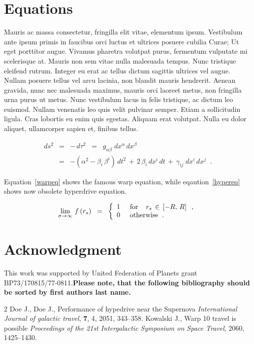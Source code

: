 \documentclass[a4paper,10pt]{article}
\begin{document}
\section{Equations}
Mauris ac massa consectetur, fringilla elit vitae, elementum ipsum. Vestibulum ante ipsum primis in faucibus orci luctus et ultrices posuere cubilia Curae; Ut eget porttitor augue. Vivamus pharetra volutpat purus, fermentum vulputate mi scelerisque at. Mauris non sem vitae nulla malesuada tempus. Nunc tristique eleifend rutrum. Integer eu erat ac tellus dictum sagittis ultrices vel augue. Nullam posuere tellus vel arcu lacinia, non blandit mauris hendrerit. Aenean gravida, nunc nec malesuada maximus, mauris orci laoreet metus, non fringilla urna purus ut metus. Nunc vestibulum lacus in felis tristique, ac dictum leo euismod. Nullam venenatis leo quis velit pulvinar semper. Etiam a sollicitudin ligula. Cras lobortis eu enim quis egestas. Aliquam erat volutpat. Nulla eu dolor aliquet, ullamcorper sapien et, finibus tellus.

\begin{eqnarray} d s^2
&=& - \, d \tau^2 \;\;=\;\; g_{\alpha \beta} \; d x^{\alpha} \, d
x^{\beta} \nonumber \\ &=& - \left( \alpha^2 - \beta_i \, \beta^i
\right) \, d t^2 \,+\, 2 \, \beta_i \, d x^i \, d t \,+\, \gamma_{ij}
\; d x^i \, d x^j \;\; .  \label{warpeq}  \end{eqnarray}

Equation~\ref{warpeq} shows the famous warp equation, while eqaution~\ref{hypereq} shows now obsolete hyperdrive equation.

 \begin{equation}
\lim_{\sigma \rightarrow \infty} \, f \left( r_s \right) \;\;=\;\; \left\{ \begin{array}{l} 1 \hspace{5mm}  {\rm for}
\hspace{4mm} r_s \,\in\, \left[ -R,\,R \right] \;\; , \\ 0 \hspace{5mm}
{\rm otherwise} \;\; .  \end{array} \right. \label{hypereq} \end{equation}

\section*{Acknowledgment}
This work was supported by United Federation of Planets grant BP73/170815/77-0811.\linebreak\textbf{Please note, that the following bibliography should be sorted by first authors last name.}


\begin{thebibliography}{2}
%
Doe J., Doe J., Performance of hypedrive near the Supernova \emph{International Journal of galactic travel}, {\bf 7}, 4, 2051, 343--358.
%
Kowalski J., Warp 10 travel is possible \emph{Proceedings of the 21st Intergalactic Symposium on Space Travel}, 2060, 1425--1430.
\end{thebibliography}
\end{document}

